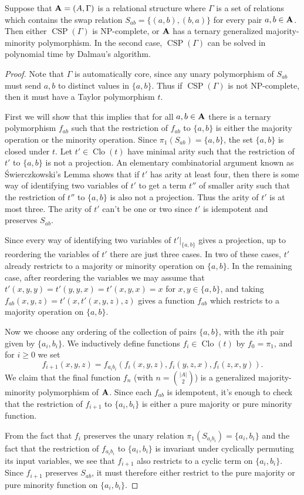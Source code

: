\documentclass[letterpaper,11pt]{article}
\DeclareMathOperator{\Clo}{Clo}
\DeclareMathOperator{\CSP}{CSP}
\begin{document}
\begin{thm} Suppose that $\mathbf{A} = (A,\Gamma)$ is a relational structure where $\Gamma$ is a set of relations which contains the swap relation $S_{ab} = \{(a,b),(b,a)\}$ for every pair $a,b \in \mathbf{A}$. Then either $\CSP(\Gamma)$ is NP-complete, or $\mathbf{A}$ has a ternary generalized majority-minority polymorphism. In the second case, $\CSP(\Gamma)$ can be solved in polynomial time by Dalmau's algorithm.
\end{thm}
\begin{proof} Note that $\Gamma$ is automatically core, since any unary polymorphism of $S_{ab}$ must send $a,b$ to distinct values in $\{a,b\}$. Thus if $\CSP(\Gamma)$ is not NP-complete, then it must have a Taylor polymorphism $t$.

First we will show that this implies that for all $a,b \in \mathbf{A}$ there is a ternary polymorphism $f_{ab}$ such that the restriction of $f_{ab}$ to $\{a,b\}$ is either the majority operation or the minority operation. Since $\pi_1(S_{ab}) = \{a,b\}$, the set $\{a,b\}$ is closed under $t$. Let $t' \in \Clo(t)$ have minimal arity such that the restriction of $t'$ to $\{a,b\}$ is not a projection. An elementary combinatorial argument known as {\'S}wierczkowski's Lemma \cite{semiprojection-lemma} shows that if $t'$ has arity at least four, then there is some way of identifying two variables of $t'$ to get a term $t''$ of smaller arity such that the restriction of $t''$ to $\{a,b\}$ is also not a projection. Thus the arity of $t'$ is at most three. The arity of $t'$ can't be one or two since $t'$ is idempotent and preserves $S_{ab}$.

Since every way of identifying two variables of $t'|_{\{a,b\}}$ gives a projection, up to reordering the variables of $t'$ there are just three cases. In two of these cases, $t'$ already restricts to a majority or minority operation on $\{a,b\}$. In the remaining case, after reordering the variables we may assume that $t'(x,y,y) = t'(y,y,x) = t'(x,y,x) = x$ for $x,y \in \{a,b\}$, and taking $f_{ab}(x,y,z) = t'(x,t'(x,y,z),z)$ gives a function $f_{ab}$ which restricts to a majority operation on $\{a,b\}$.

Now we choose any ordering of the collection of pairs $\{a,b\}$, with the $i$th pair given by $\{a_i,b_i\}$. We inductively define functions $f_i \in \Clo(t)$ by $f_0 = \pi_1$, and for $i \ge 0$ we set
\[
f_{i+1}(x,y,z) = f_{a_ib_i}(f_i(x,y,z),f_i(y,z,x),f_i(z,x,y)).
\]
We claim that the final function $f_n$ (with $n = \binom{|A|}{2}$) is a generalized majority-minority polymorphism of $\mathbf{A}$. Since each $f_{ab}$ is idempotent, it's enough to check that the restriction of $f_{i+1}$ to $\{a_i,b_i\}$ is either a pure majority or pure minority function.

From the fact that $f_i$ preserves the unary relation $\pi_1(S_{a_ib_i}) = \{a_i,b_i\}$ and the fact that the restriction of $f_{a_ib_i}$ to $\{a_i,b_i\}$ is invariant under cyclically permuting its input variables, we see that $f_{i+1}$ also restricts to a cyclic term on $\{a_i,b_i\}$. Since $f_{i+1}$ preserves $S_{ab}$, it must therefore either restrict to the pure majority or pure minority function on $\{a_i,b_i\}$.
\end{proof}
\end{document}
